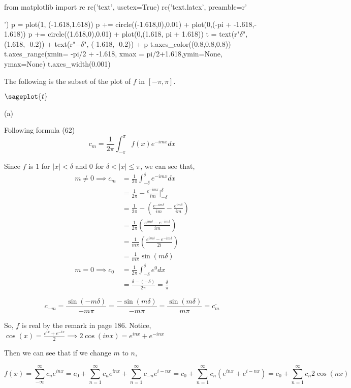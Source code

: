 \documentclass{article}
\begin{document}
\begin{sagesilent}
  from matplotlib import rc
  rc('text', usetex=True)
  rc('text.latex', preamble=r'\usepackage{amssymb}')
  p = plot(1, (-1.618,1.618))
  p += circle((-1.618,0),0.01) + plot(0,(-pi + -1.618,- 1.618))
  p += circle((1.618,0),0.01) + plot(0,(1.618, pi + 1.618))
  t = text(r"$\delta$", (1.618, -0.2)) + text(r"$-\delta$", (-1.618, -0.2)) + p
  t.axes_color((0.8,0.8,0.8))
  t.axes_range(xmin= -pi/2 + -1.618, xmax = pi/2+1.618,ymin=None, ymax=None)
  t.axes_width(0.001)
\end{sagesilent}

The following is the subset of the plot of $f$ in $[-\pi,\pi].$

$\sageplot{t}$

(a)

Following formula (62)
\[c_m = \frac{1}{2\pi} \int_{-\pi}^\pi f(x) e^{-imx} dx\]

Since $f$ is $1$ for $|x|< \delta$ and  $0$ for $\delta < |x|\leq \pi$, we can see that,
\begin{align*}
  m\neq 0 \implies c_m &= \frac{1}{2\pi} \int_{-\delta}^\delta e^{-imx} dx\\
      &=  \frac{1}{2\pi} -\frac{e^{-imx}}{im}|_{-\delta}^\delta\\
      &=\frac{1}{2\pi} -\left(\frac{e^{-im\delta}}{im} -
        \frac{e^{im\delta}}{im}\right) \\
      &=\frac{1}{2\pi} \left(\frac{e^{im\delta}-
        e^{-im\delta}}{im}\right) \\
      &=\frac{1}{m\pi} \left(\frac{e^{im\delta}-
        e^{-im\delta}}{2i}\right) \\
                       &=\frac{1}{m\pi} \sin(m\delta)\\
  m=0 \implies c_0 &= \frac{1}{2\pi} \int_{-\delta}^\delta e^{0} dx  \\
                       &=\frac{\delta-(-\delta)}{2\pi} = \frac{\delta}{\pi}
\end{align*}

\[c_{-m} =\frac{\sin(-m\delta)}{-m\pi}  = \frac{-\sin(m\delta)}{-m\pi}
  =\frac{\sin(m\delta)}{m\pi} = \overline{c_m} \]

So, $f$ is real by the remark in page 186. Notice, $\cos(x) = \frac{e^{ix}+e^{-ix}}{2}\implies 2\cos(inx) =
e^{inx}+e^{-inx}$

Then we can see that if we change $m$ to $n$,

\[f(x) = \sum_{-\infty}^\infty c_n e^{inx} = c_0
  +\sum_{n=1}^\infty c_n e^{inx} + \sum_{n=1}^\infty c_{-n} e^{i-nx}  =
  c_0 +\sum_{n=1}^\infty c_n (e^{inx} + e^{i-nx}) = c_0
  +\sum_{n=1}^\infty c_n 2 \cos(nx)  \]
\end{document}
